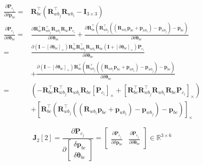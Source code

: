 \documentclass[12pt,a4paper]{article}
\begin{document}
\begin{enumerate}
\begin{enumerate}
\begin{equation}
\begin{aligned}
\frac{\partial \mathbf{P}_{c_{j}}}{\partial \delta \mathbf{p}_{bc}} 
={}& 
\mathbf{R}_{b c}^{\top}\left(\mathbf{R}_{w b_{j}}^{\top} \mathbf{R}_{w b_{i}}-\mathbf{I}_{3 \times 3}\right) 
\\
\frac{\partial \mathbf{P}_{c_{j}}}{\partial \delta \boldsymbol{\theta}_{bc}} 
={}&
\frac{\partial 
\mathbf{R}_{b c}^{\top} 
\mathbf{R}_{w b_{j}}^{\top} 
\mathbf{R}_{w b_{i}} 
\mathbf{R}_{b c} 
\mathbf{P}_{c_i}}
{\partial \delta \boldsymbol{\theta}_{bc}} 
+
\frac{\partial 
\mathbf{R}_{b c}^{\top}
\left(\mathbf{R}_{w b_{j}}^{\top} 
\left(\left(\mathbf{R}_{w b_{i}} \mathbf{p}_{b c}+\mathbf{p}_{w b_{i}}\right)
-\mathbf{p}_{w b_{j}}\right)-\mathbf{p}_{b c}\right)}
{\partial \delta \boldsymbol{\theta}_{bc}} \\
={}&
\frac{\partial 
\left(\mathbf{I}-\left[\delta \boldsymbol{\theta}_{bc}\right]_{\times}\right)
\mathbf{R}_{b c}^{\top} 
\mathbf{R}_{w b_{j}}^{\top} 
\mathbf{R}_{w b_{i}} 
\mathbf{R}_{b c} 
\left(\mathbf{I}+\left[\delta \boldsymbol{\theta}_{bc}\right]_{\times}\right)
\mathbf{P}_{c_i}}
{\partial \delta \boldsymbol{\theta}_{bc}} \\
&+
\frac{\partial 
\left(\mathbf{I}-\left[\delta \boldsymbol{\theta}_{bc}\right]_{\times}\right)
\mathbf{R}_{b c}^{\top}
\left(\mathbf{R}_{w b_{j}}^{\top} 
\left(\left(\mathbf{R}_{w b_{i}} \mathbf{p}_{b c}+\mathbf{p}_{w b_{i}}\right)
-\mathbf{p}_{w b_{j}}\right)-\mathbf{p}_{b c}\right)}
{\partial \delta \boldsymbol{\theta}_{bc}} \\
={}&
\left(-\mathbf{R}_{b c}^{\top} \mathbf{R}_{w b_{j}}^{\top} \mathbf{R}_{w b_{i}} \mathbf{R}_{b c}\left[\mathbf{P}_{c_{i}}\right]_{\times} + \left[\mathbf{R}_{b c}^{\top} \mathbf{R}_{w b_{j}}^{\top} \mathbf{R}_{w b_{i}} \mathbf{R}_{b c} \mathbf{P}_{c_{i}}\right]_{\times}\right) \\
&+
\left[\mathbf{R}_{b c}^{\top}\left(\mathbf{R}_{w b_{j}}^{\top}\left(\left(\mathbf{R}_{w b_{i}} \mathbf{p}_{b c}+\mathbf{p}_{w b_{i}}\right)-\mathbf{p}_{w b_{j}}\right)-\mathbf{p}_{b c}\right)\right]_{\times}
\end{aligned}
\end{equation}

\begin{equation}
\mathbf{J}_2[2] =
\frac{\partial \mathbf{P}_{c_{j}}}
{\partial\left[\begin{array}{c}{\delta \mathbf{p}_{bc}} \\ 
{\delta \boldsymbol{\theta}_{bc}}\end{array}\right]} =
\begin{bmatrix}
\frac{\partial \mathbf{P}_{c_{j}}}{\partial \delta \mathbf{p}_{bc}} &
\frac{\partial \mathbf{P}_{c_{j}}}{\partial \delta \boldsymbol{\theta}_{bc}} 
\end{bmatrix}
\in \mathbb{R}^{3 \times 6}
\end{equation}


\end{enumerate}
\end{enumerate}
\end{document}

